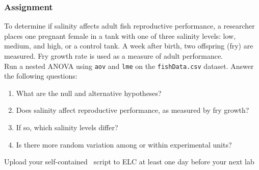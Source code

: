 \documentclass[color=usenames,dvipsnames]{beamer}\usepackage[]{graphicx}\usepackage[]{color}
\newcommand{\inr}[1]{\colorbox{inlinecolor}{\texttt{#1}}}
\begin{document}
\begin{frame}[fragile]
  \frametitle{Assignment}
  \small
  To determine if salinity affects adult fish reproductive
  performance, a researcher places one pregnant female in a tank with
  one of three salinity levels: low, medium, and high, or a control
  tank. A week after birth, two offspring (fry) are measured. Fry
  growth rate is used as a measure of adult performance.\\
  \vfill
  Run a nested ANOVA using \inr{aov} and \inr{lme} on the
  {\tt fishData.csv} dataset. Answer the following questions:
\begin{enumerate}[\bf (1)]
  \item What are the null and alternative hypotheses?
  \item Does salinity affect reproductive performance, as measured by
    fry growth? 
  \item If so, which salinity levels differ?
  \item Is there more random variation among or within experimental units?
\end{enumerate}

\vfill
\centering
\normalsize
Upload your self-contained \R~script to ELC at least one
day before your next lab \\
\end{frame}
\end{document}
